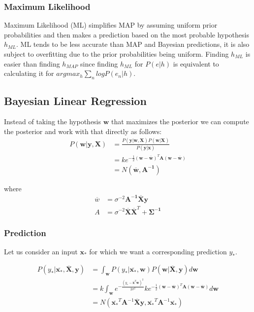 \documentclass[12pt]{article}
\begin{document}
    \subsubsection{Maximum Likelihood}
        Maximum Likelihood (ML) simplifies MAP by assuming uniform prior probabilities and then makes a prediction based on the most probable hypothesis $h_{ML}$. ML tends to be less accurate than MAP and Bayesian predictions, it is also subject to overfitting
        due to the prior probabilities being uniform. Finding $h_{ML}$ is easier than finding $h_{MAP}$ since finding $h_{ML}$ for $P(e|h)$ is equivalent to calculating it for $argmax_h \sum_n logP(e_n |h)$.

    \subsection{Bayesian Linear Regression}
        Instead of taking the hypothesis $\boldsymbol{w}$ that maximizes the posterior we can compute the posterior and work with that directly as follows:
        \begin{align*}
            P(\boldsymbol{w}|\boldsymbol{y}, \boldsymbol{X}) &= \frac{P(\boldsymbol{y}|\boldsymbol{w}, \boldsymbol{X})P(\boldsymbol{w}|\boldsymbol{X})}{P(\boldsymbol{y}|\boldsymbol{x})} \\
            &= ke^{-\frac{1}{2}(\boldsymbol{w}-\overline{\boldsymbol{w}})^T\boldsymbol{A}(\boldsymbol{w}-\overline{\boldsymbol{w}})} \\
            &= N(\overline{\boldsymbol{w}}, \boldsymbol{A^{-1}})
        \end{align*}

        where
        \begin{align*}
        \overline{w} &= \sigma^{-2}\boldsymbol{A^{-1}}\overline{\boldsymbol{X}}\boldsymbol{y} \\
        A &= \sigma^{-2}\boldsymbol{\overline{X}\overline{X}}^T + \boldsymbol{\Sigma^{-1}}
        \end{align*}

        \subsubsection{Prediction}
            Let us consider an input $\boldsymbol{x_*}$ for which we want a corresponding prediction $y_*$.

            \begin{align*}
                P(y_*|\overline{\boldsymbol{x_*}}, \overline{\boldsymbol{X}}, \boldsymbol{y}) &= \int_{\boldsymbol{w}} P(y_*|\overline{\boldsymbol{x_*}},\boldsymbol{w})P(\boldsymbol{w}|\overline{\boldsymbol{X}},\boldsymbol{y})d\boldsymbol{w} \\
                &= k \int_{\boldsymbol{w}} e^{-\frac{(y_* - \overline{\boldsymbol{x}}^T\boldsymbol{w})^2}{2\sigma^2}} ke^{-\frac{1}{2}(\boldsymbol{w}-\overline{\boldsymbol{w}})^T\boldsymbol{A}(\boldsymbol{w}-\overline{\boldsymbol{w}})}d\boldsymbol{w} \\
                &= N(\overline{\boldsymbol{x_*}}^T \boldsymbol{A}^{-1}\overline{\boldsymbol{X}}\boldsymbol{y}, \overline{\boldsymbol{x_*}}^T \boldsymbol{A}^{-1} \overline{\boldsymbol{x_*}})
            \end{align*}
\end{document}
